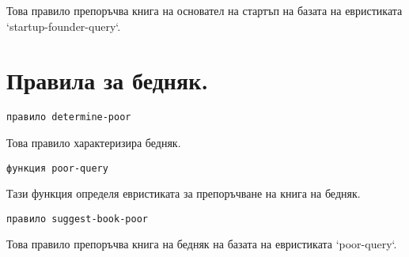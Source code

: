 \documentclass[a4paper]{article}
\begin{document}
Това правило препоръчва книга на основател на стартъп на базата на 
евристиката `startup-founder-query`.
\section{Правила за бедняк.}
\begin{verbatim}правило determine-poor\end{verbatim}

Това правило характеризира бедняк.
\begin{verbatim}функция poor-query\end{verbatim}

Тази функция определя евристиката за препоръчване на книга на бедняк.
\begin{verbatim}правило suggest-book-poor\end{verbatim}

Това правило препоръчва книга на бедняк на базата на евристиката 
`poor-query`.
\end{document}
